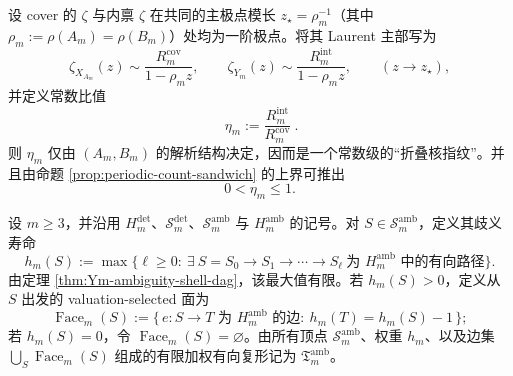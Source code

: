 \begin{proposition}[主极点留数比作为常数级核指纹]\label{prop:Ym-zeta-residue-ratio}
设 cover 的 \(\zeta\) 与内禀 \(\zeta\) 在共同的主极点模长 \(z_\star=\rho_m^{-1}\)（其中 \(\rho_m:=\rho(A_m)=\rho(B_m)\)）处均为一阶极点。将其 Laurent 主部写为
\[
\zeta_{X_{A_m}}(z)\sim \frac{R_m^{\mathrm{cov}}}{1-\rho_m z},
\qquad
\zeta_{Y_m}(z)\sim \frac{R_m^{\mathrm{int}}}{1-\rho_m z},
\qquad (z\to z_\star),
\]
并定义常数比值
\[
\boxed{\ \eta_m:=\frac{R_m^{\mathrm{int}}}{R_m^{\mathrm{cov}}}\ }.
\]
则 \(\eta_m\) 仅由 \((A_m,B_m)\) 的解析结构决定，因而是一个常数级的“折叠核指纹”。并且由命题 \ref{prop:periodic-count-sandwich} 的上界可推出
\[
0<\eta_m\le 1.
\]
\end{proposition}
\begin{definition}\label{distill:khovanskii_newton_polyhedra_fewnomials_and_tropical_skeletons-support_to_skeleton_reduction-ambiguity-valuation-skeleton-def}
设 \(m\ge3\)，并沿用 \(H_m^{\mathrm{det}}\)、\(\mathcal S_m^{\mathrm{det}}\)、\(\mathcal S_m^{\mathrm{amb}}\) 与 \(H_m^{\mathrm{amb}}\) 的记号。对 \(S\in\mathcal S_m^{\mathrm{amb}}\)，定义其歧义寿命
\[
 h_m(S):=\max\{\ell\ge0:\ \exists\ S=S_0\to S_1\to\cdots\to S_\ell\ \text{为 }H_m^{\mathrm{amb}}\text{ 中的有向路径}\}.
\]
由定理 \ref{thm:Ym-ambiguity-shell-dag}，该最大值有限。若 \(h_m(S)>0\)，定义从 \(S\) 出发的 valuation-selected 面为
\[
 \operatorname{Face}_m(S):=\{\,e:S\to T\text{ 为 }H_m^{\mathrm{amb}}\text{ 的边}:\ h_m(T)=h_m(S)-1\,\};
\]
若 \(h_m(S)=0\)，令 \(\operatorname{Face}_m(S)=\varnothing\)。由所有顶点 \(\mathcal S_m^{\mathrm{amb}}\)、权重 \(h_m\)、以及边集 \(\bigcup_S\operatorname{Face}_m(S)\) 组成的有限加权有向复形记为 \(\mathfrak T_m^{\mathrm{amb}}\)。
\end{definition}

